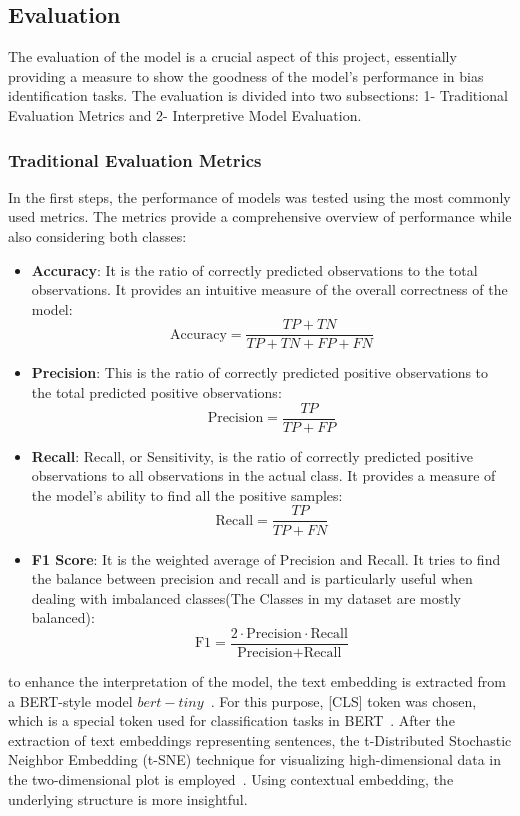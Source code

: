 \documentclass[11pt,a4paper]{article}
\begin{document}
\subsection{Evaluation}
The evaluation of the model is a crucial aspect of this project, essentially providing a measure to show the goodness of the model's performance in bias identification tasks. The evaluation is divided into two subsections: 1- Traditional Evaluation Metrics and 2- Interpretive Model Evaluation.

\subsubsection{Traditional Evaluation Metrics}
In the first steps, the performance of models was tested using the most commonly used metrics. The metrics provide a comprehensive overview of performance while also considering both classes:
\begin{itemize}
    \item \textbf{Accuracy}: It is the ratio of correctly predicted observations to the total observations. It provides an intuitive measure of the overall correctness of the model:
    $$
    \text{Accuracy} = \frac{TP+TN}{TP+TN+FP+FN}
    $$
    \item \textbf{Precision}: This is the ratio of correctly predicted positive observations to the total predicted positive observations:
    $$
    \text{Precision} = \frac{TP}{TP+FP}
    $$
    \item \textbf{Recall}: Recall, or Sensitivity, is the ratio of correctly predicted positive observations to all observations in the actual class. It provides a measure of the model’s ability to find all the positive samples:
    $$
    \text{Recall} = \frac{TP}{TP+FN}
    $$
    \item \textbf{F1 Score}: It is the weighted average of Precision and Recall. It tries to find the balance between precision and recall and is particularly useful when dealing with imbalanced classes(The Classes in my dataset are mostly balanced):
    $$
    \text{F1} = \frac{2 \cdot \text{Precision} \cdot \text{Recall}}{\text{Precision} + \text{Recall}}
    $$
\end{itemize}
to enhance the interpretation of the model, the text embedding is extracted from a BERT-style model $bert-tiny$~\cite{iuliaturc_2019_wellread, bhargava_2021_generalization}. For this purpose, [CLS] token was chosen, which is a special token used for classification tasks in BERT~\cite{devlin_2018_bert}. After the extraction of text embeddings representing sentences, the t-Distributed Stochastic Neighbor Embedding (t-SNE) technique for visualizing high-dimensional data in the two-dimensional plot is employed~\cite{com_2008_visualizing, arora_2018_an}. Using contextual embedding, the underlying structure is more insightful.
\end{document}

